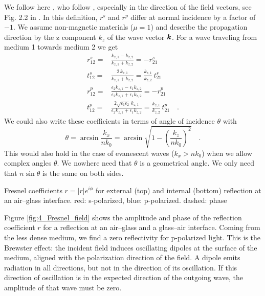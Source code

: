 We follow here \cite{Novotny-Hecht2012}, who follow \cite{BornWolf2002}, especially in the direction of the field vectors, see Fig. 2.2 in \cite{Novotny-Hecht2012}. In this definition,  $r^s$ and $r^p$ differ at normal incidence by a factor of $-1$. We assume non-magnetic materials ($\mu = 1$) and describe the propagation direction by the z component $k_z$ of the wave vector $\boldsymbol{k}$. For a wave traveling from medium 1 towards medium 2 we get
\begin{align}
 r_{12}^s = & \frac{k_{z,1} - k_{z,2}}{k_{z,1} + k_{z,2}}  = - r_{21}^s\\
 t_{12}^s = & \frac{2 \, k_{z,1}}{k_{z,1} + k_{z,2}} =  \frac{k_{z,1}}{k_{z,2}}  \,  t_{21}^s\\
  r_{12}^p = & \frac{\epsilon_2	 k_{z,1} - \epsilon_1 k_{z,2}}
				  {\epsilon_2 k_{z,1} + \epsilon_1 k_{z,2}}  = - r_{21}^p\\
  t_{12}^p = & \frac{2 \sqrt{\epsilon_1 \epsilon_2}	 \,k_{z,1} }
				  {\epsilon_2 k_{z,1} + \epsilon_1 k_{z,2}}  = \frac{k_{z,1}}{k_{z,2}}  \,  t_{21}^p \quad . 
\end{align}
We could also write these coefficients in terms of angle of incidence $\theta$ with
\begin{equation}
 \theta = \arcsin \frac{k_x}{n k_0} = \arcsin \sqrt{1 - \left( \frac{k_z}{n k_0} \right)^2 } \quad . 
\end{equation}
This would also hold in the case of evanescent waves ($k_x > n k_0$) when we allow complex angles $\theta$. We nowhere need that $\theta$ is a geometrical angle. We only need that $n \sin \theta$ is the same on both sides.

\begin{marginfigure}

\caption{Fresnel coefficients  $r = |r|e^{i \phi}$ for external (top) and internal (bottom) reflection at an air--glass interface. red: s-polarized, blue: p-polarized. dashed: phase \label{fig:4_Fresnel_field}}
\end{marginfigure}

Figure \ref{fig:4_Fresnel_field} shows the amplitude and phase of the reflection coefficient $r$ for a reflection at an air--glass and a glass--air interface. Coming from the less dense medium, we find a zero reflectivity for p-polarized light. This is the Brewster effect: the incident field induces oscillating dipoles at the surface of the medium, aligned with the polarization direction of the field. A dipole emits radiation in all directions, but not in the direction of its oscillation. If this direction of oscillation is in the expected direction of the outgoing wave, the amplitude of that wave must be zero.


